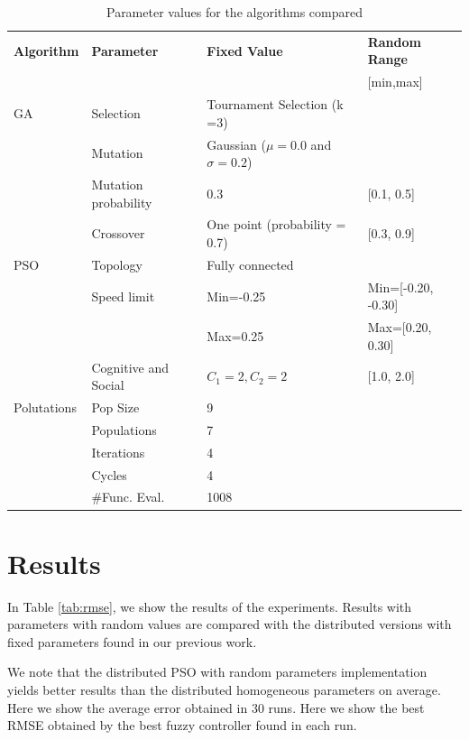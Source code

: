 \documentclass[runningheads]{llncs}
\begin{document}
\begin{table}[htbp] 
\small
\caption{Parameter values for the algorithms compared}\label{tab:alg_params}
\begin{tabular}{l l l l}
\hline
\textbf{Algorithm} & \textbf{Parameter}	& \textbf{Fixed Value} & \textbf{Random Range}\\ 
                   &                    &                      &      [min,max]\\ \hline
GA & Selection & Tournament Selection (k =3)  \\
& Mutation  & Gaussian ($\mu=0.0$ and $\sigma=0.2$)  \\
& Mutation probability  &  0.3 &  [0.1, 0.5] \\
& Crossover  & One point (probability = 0.7) &  [0.3, 0.9]   \\
\hline
PSO & Topology & Fully connected  \\
& Speed limit & Min=-0.25 & Min=[-0.20, -0.30] \\
&             & Max=0.25 &  Max=[0.20, 0.30]  \\
& Cognitive and Social & $C_1=2,C_2=2$ &  [1.0, 2.0]  \\
\hline
Polutations& Pop Size &  9  \\
& Populations & 7 \\
& Iterations & 4 \\
& Cycles & 4   \\
& \#Func. Eval. & 1008 \\
\hline
\end{tabular}
\end{table}

\section{Results}\label{sec:results}

In Table \ref{tab:rmse}, we show the results of the experiments. Results with
parameters with random values are compared with the distributed
versions with fixed parameters found in our previous work.

We note that the distributed PSO with random parameters implementation
yields better results than the distributed homogeneous parameters on average.
Here we show the average error obtained in 30 runs. Here we show the best RMSE
obtained by the best fuzzy controller found in each run.
\end{document}
